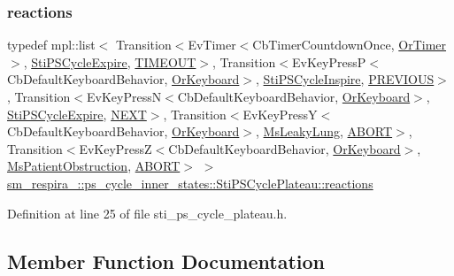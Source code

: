 \subsubsection{\texorpdfstring{reactions}{reactions}}
{\footnotesize\ttfamily typedef mpl\+::list$<$ Transition$<$Ev\+Timer$<$Cb\+Timer\+Countdown\+Once, \hyperlink{classsm__respira__1_1_1OrTimer}{Or\+Timer}$>$, \hyperlink{structsm__respira__1_1_1ps__cycle__inner__states_1_1StiPSCycleExpire}{Sti\+P\+S\+Cycle\+Expire}, \hyperlink{structsm__respira__1_1_1ps__cycle__inner__states_1_1StiPSCyclePlateau_1_1TIMEOUT}{T\+I\+M\+E\+O\+UT}$>$, Transition$<$Ev\+Key\+PressP$<$Cb\+Default\+Keyboard\+Behavior, \hyperlink{classsm__respira__1_1_1OrKeyboard}{Or\+Keyboard}$>$, \hyperlink{structsm__respira__1_1_1ps__cycle__inner__states_1_1StiPSCycleInspire}{Sti\+P\+S\+Cycle\+Inspire}, \hyperlink{structsm__respira__1_1_1ps__cycle__inner__states_1_1StiPSCyclePlateau_1_1PREVIOUS}{P\+R\+E\+V\+I\+O\+US}$>$, Transition$<$Ev\+Key\+PressN$<$Cb\+Default\+Keyboard\+Behavior, \hyperlink{classsm__respira__1_1_1OrKeyboard}{Or\+Keyboard}$>$, \hyperlink{structsm__respira__1_1_1ps__cycle__inner__states_1_1StiPSCycleExpire}{Sti\+P\+S\+Cycle\+Expire}, \hyperlink{structsm__respira__1_1_1ps__cycle__inner__states_1_1StiPSCyclePlateau_1_1NEXT}{N\+E\+XT}$>$, Transition$<$Ev\+Key\+PressY$<$Cb\+Default\+Keyboard\+Behavior, \hyperlink{classsm__respira__1_1_1OrKeyboard}{Or\+Keyboard}$>$, \hyperlink{classsm__respira__1_1_1MsLeakyLung}{Ms\+Leaky\+Lung}, \hyperlink{classABORT}{A\+B\+O\+RT}$>$, Transition$<$Ev\+Key\+PressZ$<$Cb\+Default\+Keyboard\+Behavior, \hyperlink{classsm__respira__1_1_1OrKeyboard}{Or\+Keyboard}$>$, \hyperlink{classsm__respira__1_1_1MsPatientObstruction}{Ms\+Patient\+Obstruction}, \hyperlink{classABORT}{A\+B\+O\+RT}$>$ $>$ \hyperlink{structsm__respira__1_1_1ps__cycle__inner__states_1_1StiPSCyclePlateau_a8bbf7a1639dec1403c8a64cee4814687}{sm\+\_\+respira\+\_\+::ps\+\_\+cycle\+\_\+inner\+\_\+states\+::\+Sti\+P\+S\+Cycle\+Plateau\+::reactions}}



Definition at line 25 of file sti\+\_\+ps\+\_\+cycle\+\_\+plateau.\+h.



\subsection{Member Function Documentation}
\mbox{\label{structsm__respira__1_1_1ps__cycle__inner__states_1_1StiPSCyclePlateau_adc4eafbbb1e85f3ed749a473a5f8da19}} 
